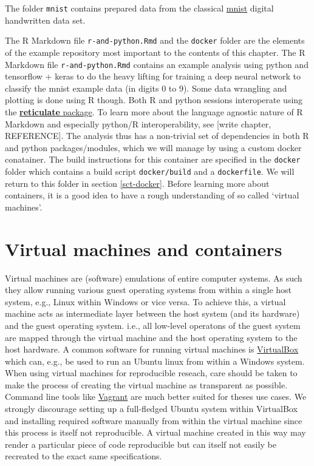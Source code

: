 \documentclass[]{book}
\begin{document}
The folder \texttt{mnist} contains prepared data from the classical
\href{http://yann.lecun.com/exdb/mnist/}{mnist} digital handwritten data
set.

The R Markdown file \texttt{r-and-python.Rmd} and the \texttt{docker}
folder are the elements of the example repository most important to the
contents of this chapter. The R Markdown file \texttt{r-and-python.Rmd}
contains an example analysis using python and tensorflow + keras to do
the heavy lifting for training a deep neural network to classify the
mnist example data (in digits 0 to 9). Some data wrangling and plotting
is done using R though. Both R and python sessions interoperate using
the \href{https://github.com/rstudio/reticulate}{\textbf{reticulate}
package}. To learn more about the language agnostic nature of R Markdown
and especially python/R interoperability, see {[}write chapter,
REFERENCE{]}. The analysis thus has a non-trivial set of dependencies in
both R and python packages/modules, which we will manage by using a
custom docker conatainer. The build instructions for this container are
specified in the \texttt{docker} folder which contains a build script
\texttt{docker/build} and a \texttt{dockerfile}. We will return to this
folder in section \ref{sct-docker}. Before learning more about
containers, it is a good idea to have a rough understanding of so called
`virtual machines'.

\section{Virtual machines and
containers}\label{virtual-machines-and-containers}

Virtual machines are (software) emulations of entire computer systems.
As such they allow running various guest operating systems from within a
single host system, e.g., Linux within Windows or vice versa. To achieve
this, a virtual machine acts as intermediate layer between the host
system (and its hardware) and the guest operating system. i.e., all
low-level operatons of the guest system are mapped through the virtual
machine and the host operating system to the host hardware. A common
software for running virtual machines is
\href{https://www.virtualbox.org/}{VirtualBox} which can, e.g., be used
to run an Ubuntu linux from within a Windows system. When using virtual
machines for reproducible reseach, care should be taken to make the
process of creating the virtual machine as transparent as possible.
Command line tools like \href{https://www.vagrantup.com/}{Vagrant} are
much better suited for theses use cases. We strongly discourage setting
up a full-fledged Ubuntu system within VirtualBox and installing
required software manually from within the virtual machine since this
process is itself not reproducible. A virtual machine created in this
way may render a particular piece of code reproducible but can itself
not easily be recreated to the exact same specifications.
\end{document}

